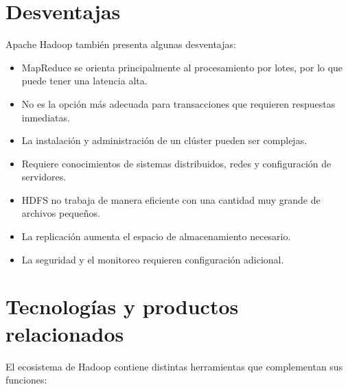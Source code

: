 \section{Desventajas}

Apache Hadoop también presenta algunas desventajas:

\begin{itemize}
    \item MapReduce se orienta principalmente al procesamiento por lotes, por
    lo que puede tener una latencia alta.

    \item No es la opción más adecuada para transacciones que requieren
    respuestas inmediatas.

    \item La instalación y administración de un clúster pueden ser complejas.

    \item Requiere conocimientos de sistemas distribuidos, redes y
    configuración de servidores.

    \item HDFS no trabaja de manera eficiente con una cantidad muy grande de
    archivos pequeños.

    \item La replicación aumenta el espacio de almacenamiento necesario.

    \item La seguridad y el monitoreo requieren configuración adicional.
\end{itemize}

\section{Tecnologías y productos relacionados}

El ecosistema de Hadoop contiene distintas herramientas que complementan sus
funciones:

